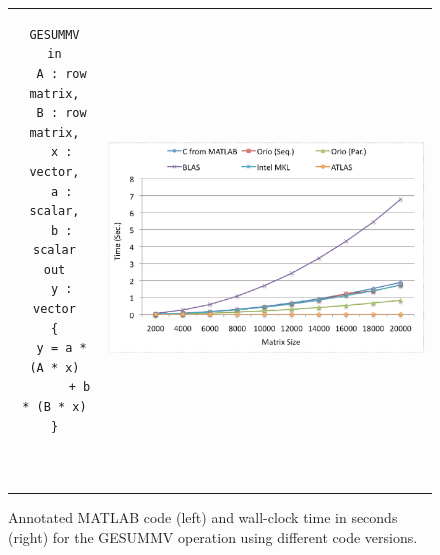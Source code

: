 \documentclass[runningheads]{llncs}
\begin{document}
\begin{figure}[htp]
\centering
\begin{tabular}{cc}
\begin{minipage}[b]{.3\textwidth}
\footnotesize
\begin{verbatim}
GESUMMV
in
  A : row matrix,
  B : row matrix,
  x : vector,
  a : scalar,
  b : scalar
out
  y : vector
{
  y = a * (A * x)
       + b * (B * x)
}



\end{verbatim}
\end{minipage}
&
\begin{minipage}[b]{.6\textwidth}
\includegraphics[width=\textwidth]{figures/gesummv.eps}
\end{minipage}\\
\end{tabular}
\caption{Annotated MATLAB code (left) and wall-clock time in seconds (right) for the GESUMMV operation using different code versions.}
\label{fig:gesummv}
\end{figure}


%
\end{document}
